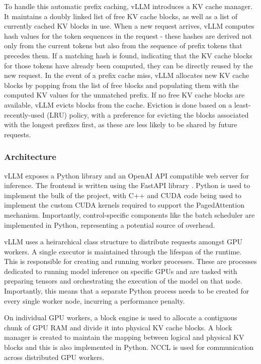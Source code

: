 \documentclass[11pt,twoside]{report}
\begin{document}
To handle this automatic prefix caching, vLLM introduces a KV cache manager.
It maintains a doubly linked list of free KV cache blocks, as well as a list of currently cached KV blocks in use.
When a new request arrives, vLLM computes hash values for the token sequences in the request - these hashes are derived not only from the current tokens but also from the sequence of prefix tokens that precedes them. 
If a matching hash is found, indicating that the KV cache blocks for those tokens have already been computed, they can be directly reused by the new request.
In the event of a prefix cache miss, vLLM allocates new KV cache blocks by popping from the list of free blocks and populating them with the computed KV values for the unmatched prefix.
If no free KV cache blocks are available, vLLM evicts blocks from the cache. 
Eviction is done based on a least-recently-used (LRU) policy, with a preference for evicting the blocks associated with the longest prefixes first, as these are less likely to be shared by future requests.


\subsubsection{Architecture}
vLLM exposes a Python library and an OpenAI API \cite{openaiapi} compatible web server for inference.
The frontend is written using the FastAPI library \cite{fastapi}.
Python is used to implement the bulk of the project, with C++ and CUDA code being used to implement the custom CUDA kernels required to support the PagedAttention mechanism.
Importantly, control-specific components like the batch scheduler are implemented in Python, representing a potential source of overhead.

vLLM uses a heirarchical class structure to distribute requests amongst GPU workers.
A single executor is maintained through the lifespan of the runtime.
This is responsible for creating and running worker processes.
These are processes dedicated to running model inference on specific GPUs and are tasked with preparing tensors and orchestrating the execution of the model on that node. 
Importantly, this means that a separate Python process needs to be created for every single worker node, incurring a performance penalty.

On individual GPU workers, a block engine is used to allocate a contiguous chunk of GPU RAM and divide it into physical KV cache blocks.
A block manager is created to maintain the mapping between logical and physical KV blocks and this is also implemented in Python. 
NCCL \cite{nccl} is used for communication across distributed GPU workers.
\end{document}
